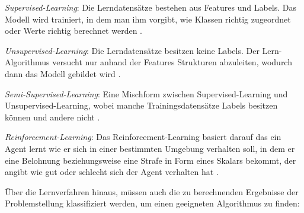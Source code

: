 \begin{itemize*}
\item \emph{Supervised-Learning}: Die Lerndatensätze bestehen aus Features und Labels. Das Modell wird trainiert, in dem man ihm vorgibt, wie Klassen richtig zugeordnet oder Werte richtig berechnet werden \cite[vgl. S. 68]{EM17}. 
\item \emph{Unsupervised-Learning}: Die Lerndatensätze besitzen keine Labels. Der Lern-Algorithmus versucht nur anhand der Features Strukturen abzuleiten, wodurch dann das Modell gebildet wird \cite[]{SG17, EM17}. 
\item \emph{Semi-Supervised-Learning}: Eine Mischform zwischen Supervised-Learning und Unsupervised-Learning, wobei manche Trainingsdatensätze Labels besitzen können und andere nicht \cite[vgl. S. 892]{ZH10}. 
\item \emph{Reinforcement-Learning}: Das Reinforcement-Learning basiert darauf das ein Agent lernt wie er sich in einer bestimmten Umgebung verhalten soll, in dem er eine Belohnung beziehungsweise eine Strafe in Form eines Skalars bekommt, der angibt wie gut oder schlecht sich der Agent verhalten hat \cite[vgl. S. 5]{WO12}.  
\end{itemize*}    

Über die Lernverfahren hinaus, müssen auch die zu berechnenden Ergebnisse der Problemstellung klassifiziert werden, um einen geeigneten Algorithmus zu finden:

